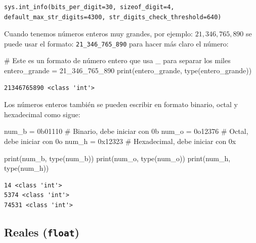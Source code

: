 \documentclass[
  spanish,
  letterpaper,
]{scrbook}
\newenvironment{Shaded}{\begin{snugshade}}{\end{snugshade}}
\newcommand{\BaseNTok}[1]{\textcolor[rgb]{0.68,0.00,0.00}{#1}}
\newcommand{\BuiltInTok}[1]{\textcolor[rgb]{0.00,0.23,0.31}{#1}}
\newcommand{\CommentTok}[1]{\textcolor[rgb]{0.37,0.37,0.37}{#1}}
\newcommand{\DecValTok}[1]{\textcolor[rgb]{0.68,0.00,0.00}{#1}}
\newcommand{\NormalTok}[1]{\textcolor[rgb]{0.00,0.23,0.31}{#1}}
\newcommand{\OperatorTok}[1]{\textcolor[rgb]{0.37,0.37,0.37}{#1}}
\theoremstyle{definition}
\theoremstyle{remark}
\begin{document}
\begin{verbatim}
sys.int_info(bits_per_digit=30, sizeof_digit=4, default_max_str_digits=4300, str_digits_check_threshold=640)
\end{verbatim}

Cuando tenemos números enteros muy grandes, por ejemplo:
\(21,346,765,890\) se puede usar el formato: \texttt{21\_346\_765\_890}
para hacer más claro el número:

\begin{Shaded}
\begin{Highlighting}[]
\CommentTok{\# Este es un formato de número entero que usa \_ para separar los miles}
\NormalTok{entero\_grande }\OperatorTok{=} \DecValTok{21\_346\_765\_890}
\BuiltInTok{print}\NormalTok{(entero\_grande, }\BuiltInTok{type}\NormalTok{(entero\_grande))}
\end{Highlighting}
\end{Shaded}

\begin{verbatim}
21346765890 <class 'int'>
\end{verbatim}

Los números enteros también se pueden escribir en formato binario, octal
y hexadecimal como sigue:

\begin{Shaded}
\begin{Highlighting}[]
\NormalTok{num\_b }\OperatorTok{=} \BaseNTok{0b01110} \CommentTok{\# Binario, debe iniciar con 0b}
\NormalTok{num\_o }\OperatorTok{=} \BaseNTok{0o12376} \CommentTok{\# Octal, debe iniciar con 0o}
\NormalTok{num\_h }\OperatorTok{=} \BaseNTok{0x12323} \CommentTok{\# Hexadecimal, debe iniciar con 0x}

\BuiltInTok{print}\NormalTok{(num\_b, }\BuiltInTok{type}\NormalTok{(num\_b))}
\BuiltInTok{print}\NormalTok{(num\_o, }\BuiltInTok{type}\NormalTok{(num\_o))}
\BuiltInTok{print}\NormalTok{(num\_h, }\BuiltInTok{type}\NormalTok{(num\_h))}
\end{Highlighting}
\end{Shaded}

\begin{verbatim}
14 <class 'int'>
5374 <class 'int'>
74531 <class 'int'>
\end{verbatim}

\subsection{\texorpdfstring{Reales
(\texttt{float})}{Reales (float)}}\label{reales-float}
\end{document}
